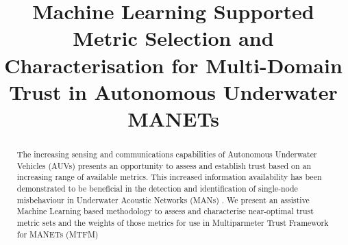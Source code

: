 \documentclass[conference]{IEEEtran}
\begin{document}
%
\title{Machine Learning Supported Metric Selection and Characterisation for Multi-Domain Trust in Autonomous Underwater MANETs}


\author{
\and
{}
}





\maketitle


\begin{abstract}

The increasing sensing and communications capabilities of Autonomous Underwater Vehicles (AUVs) presents an opportunity to assess and establish trust based on an increasing range of available metrics. This increased information availability has been demonstrated to be beneficial in the detection and identification of single-node misbehaviour in Underwater Acoustic Networks (MANs) \cite{Bolster2015}.
We present an assistive Machine Learning based methodology to assess and characterise near-optimal trust metric sets and the weights of those metrics for use in Multiparmeter Trust Framework for MANETs (MTFM) \cite{Guo11}

\end{abstract}

%
\IEEEpeerreviewmaketitle
\end{document}
